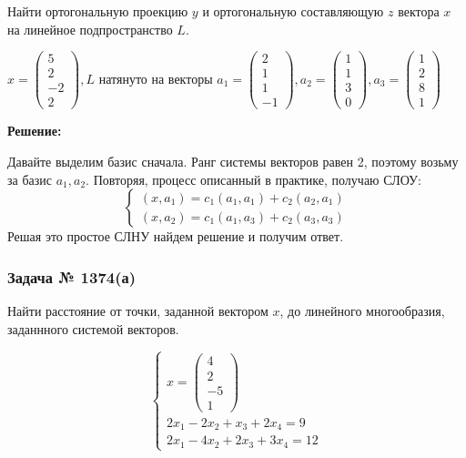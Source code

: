 Найти ортогональную проекцию $y$ и ортогональную составляющую $z$ вектора $x$ на линейное подпространство $L$.

$x = \begin{pmatrix}
    5 \\
    2\\-2\\2
\end{pmatrix}, L$ натянуто на векторы $a_1 = \begin{pmatrix}
    2 \\
    1\\
    1\\-1
\end{pmatrix}, a_2 = \begin{pmatrix}
    1\\
    1\\
    3\\
    0
\end{pmatrix}, a_3 = \begin{pmatrix}
    1 \\2\\8\\1
\end{pmatrix}$

\textbf{Решение:}

Давайте выделим базис сначала. Ранг системы векторов равен 2, поэтому возьму за базис $a_1,a_2$. Повторяя, процесс описанный в практике, получаю СЛОУ:
$$
\begin{cases}
    (x,a_1) = c_1(a_1,a_1) + c_2(a_2,a_1)\\
    (x,a_2)  = c_1(a_1,a_3) + c_2(a_3,a_3)
\end{cases}
$$
Решая это простое СЛНУ найдем решение и получим ответ.

\subsubsection{Задача № 1374(а)}

Найти расстояние от точки, заданной вектором $x$, до линейного многообразия, заданнного системой векторов.

$$\begin{cases}
    x = \begin{pmatrix}
        4\\
        2\\
        -5\\
        1
    \end{pmatrix}\\
    2x_1 - 2x_2 + x_3 + 2x_4 = 9\\
    2x_1 - 4x_2 + 2x_3 + 3x_4 =12
\end{cases}$$


